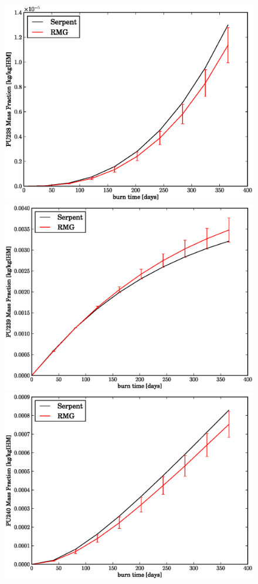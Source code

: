 \begin{figure}[htbp]
\begin{center}
\includegraphics[scale=0.3]{multigroup_method/figs/benchmark/PU238_Mass_Fraction_.eps}
\includegraphics[scale=0.3]{multigroup_method/figs/benchmark/PU239_Mass_Fraction_.eps}
\includegraphics[scale=0.3]{multigroup_method/figs/benchmark/PU240_Mass_Fraction_.eps}
\end{center}
\end{figure}

